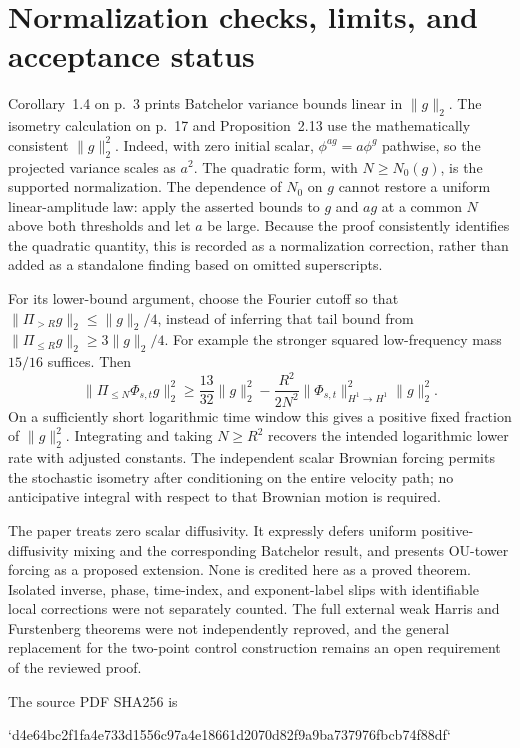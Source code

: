 \documentclass[10pt]{article}
\begin{document}
\section*{Normalization checks, limits, and acceptance status}
Corollary 1.4 on p. 3 prints Batchelor variance bounds linear in \(\|g\|_2\). The isometry calculation on p. 17 and Proposition 2.13 use the mathematically consistent \(\|g\|_2^2\). Indeed, with zero initial scalar, \(\phi^{ag}=a\phi^g\) pathwise, so the projected variance scales as \(a^2\). The quadratic form, with \(N\ge N_0(g)\), is the supported normalization. The dependence of \(N_0\) on \(g\) cannot restore a uniform linear-amplitude law: apply the asserted bounds to \(g\) and \(ag\) at a common \(N\) above both thresholds and let \(a\) be large. Because the proof consistently identifies the quadratic quantity, this is recorded as a normalization correction, rather than added as a standalone finding based on omitted superscripts.\par
For its lower-bound argument, choose the Fourier cutoff so that \(\|\Pi_{>R}g\|_2\le\|g\|_2/4\), instead of inferring that tail bound from \(\|\Pi_{\le R}g\|_2\ge3\|g\|_2/4\). For example the stronger squared low-frequency mass \(15/16\) suffices. Then \[\|\Pi_{\le N}\Phi_{s,t}g\|_2^2
 \ge \frac{13}{32}\|g\|_2^2
 -\frac{R^2}{2N^2}
       \|\Phi_{s,t}\|_{H^1\to H^1}^2\|g\|_2^2.\] On a sufficiently short logarithmic time window this gives a positive fixed fraction of \(\|g\|_2^2\). Integrating and taking \(N\ge R^2\) recovers the intended logarithmic lower rate with adjusted constants. The independent scalar Brownian forcing permits the stochastic isometry after conditioning on the entire velocity path; no anticipative integral with respect to that Brownian motion is required.\par
The paper treats zero scalar diffusivity. It expressly defers uniform positive-diffusivity mixing and the corresponding Batchelor result, and presents OU-tower forcing as a proposed extension. None is credited here as a proved theorem. Isolated inverse, phase, time-index, and exponent-label slips with identifiable local corrections were not separately counted. The full external weak Harris and Furstenberg theorems were not independently reproved, and the general replacement for the two-point control construction remains an open requirement of the reviewed proof.\par
The source PDF SHA256 is\par
`d4e64bc2f1fa4e733d1556c97a4e18661d2070d82f9a9ba737976fbcb74f88df`\par
\end{document}
